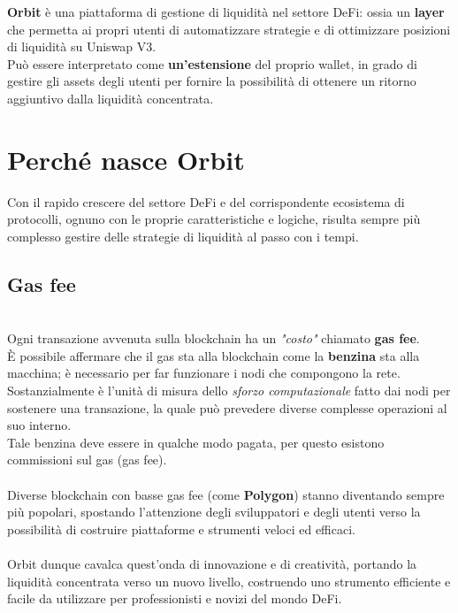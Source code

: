 \documentclass[12pt,a4paper]{report}
\begin{document}
\textbf{Orbit} è una piattaforma di gestione di liquidità nel settore DeFi: ossia un \textbf{layer} che permetta ai propri utenti di automatizzare strategie e di ottimizzare posizioni di liquidità su Uniswap V3.
\\Può essere interpretato come \textbf{un'estensione} del proprio wallet, in grado di gestire gli assets degli utenti per fornire la possibilità di ottenere un ritorno aggiuntivo dalla liquidità concentrata.

\section{Perché nasce Orbit}

Con il rapido crescere del settore DeFi e del corrispondente ecosistema di protocolli, ognuno con le proprie caratteristiche e logiche, risulta sempre più complesso gestire delle strategie di liquidità al passo con i tempi.

\subsection{Gas fee}
\\Ogni transazione avvenuta sulla blockchain ha un \textit{"costo"} chiamato \textbf{gas fee}\cite{gas}.
\\È possibile affermare che il gas sta alla blockchain come la \textbf{benzina} sta alla macchina; è necessario per far funzionare i nodi che compongono la rete.
\\Sostanzialmente è l'unità di misura dello \textit{sforzo computazionale} fatto dai nodi per sostenere una transazione, la quale può prevedere diverse complesse operazioni al suo interno.
\\Tale benzina deve essere in qualche modo pagata, per questo esistono commissioni sul gas (gas fee).
\\\\Diverse blockchain con basse gas fee (come \textbf{Polygon}\cite{polygon}) stanno diventando sempre più popolari, spostando l'attenzione degli sviluppatori e degli utenti verso la possibilità di costruire piattaforme e strumenti veloci ed efficaci.
\\\\Orbit dunque cavalca quest'onda di innovazione e di creatività, portando la liquidità concentrata verso un nuovo livello, costruendo uno strumento efficiente e facile da utilizzare per professionisti e novizi del mondo DeFi.\\\\
\end{document}
